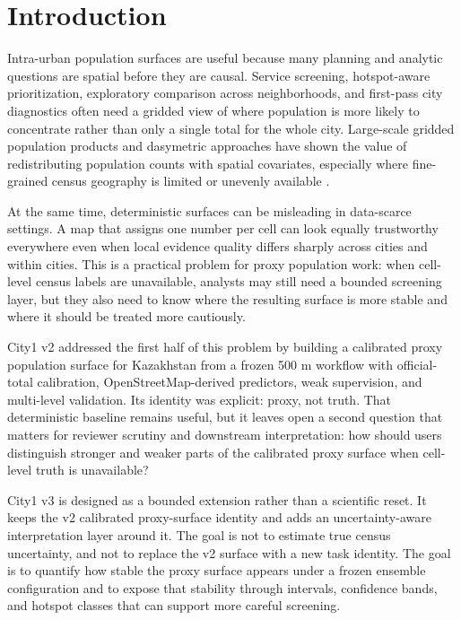 \section{Introduction}

Intra-urban population surfaces are useful because many planning and analytic questions are spatial before they are causal. Service screening, hotspot-aware prioritization, exploratory comparison across neighborhoods, and first-pass city diagnostics often need a gridded view of where population is more likely to concentrate rather than only a single total for the whole city. Large-scale gridded population products and dasymetric approaches have shown the value of redistributing population counts with spatial covariates, especially where fine-grained census geography is limited or unevenly available \cite{Leyk2019,Mennis2009,Stevens2015}.

At the same time, deterministic surfaces can be misleading in data-scarce settings. A map that assigns one number per cell can look equally trustworthy everywhere even when local evidence quality differs sharply across cities and within cities. This is a practical problem for proxy population work: when cell-level census labels are unavailable, analysts may still need a bounded screening layer, but they also need to know where the resulting surface is more stable and where it should be treated more cautiously.

City1 v2 addressed the first half of this problem by building a calibrated proxy population surface for Kazakhstan from a frozen 500 m workflow with official-total calibration, OpenStreetMap-derived predictors, weak supervision, and multi-level validation. Its identity was explicit: proxy, not truth. That deterministic baseline remains useful, but it leaves open a second question that matters for reviewer scrutiny and downstream interpretation: how should users distinguish stronger and weaker parts of the calibrated proxy surface when cell-level truth is unavailable?

City1 v3 is designed as a bounded extension rather than a scientific reset. It keeps the v2 calibrated proxy-surface identity and adds an uncertainty-aware interpretation layer around it. The goal is not to estimate true census uncertainty, and not to replace the v2 surface with a new task identity. The goal is to quantify how stable the proxy surface appears under a frozen ensemble configuration and to expose that stability through intervals, confidence bands, and hotspot classes that can support more careful screening.

